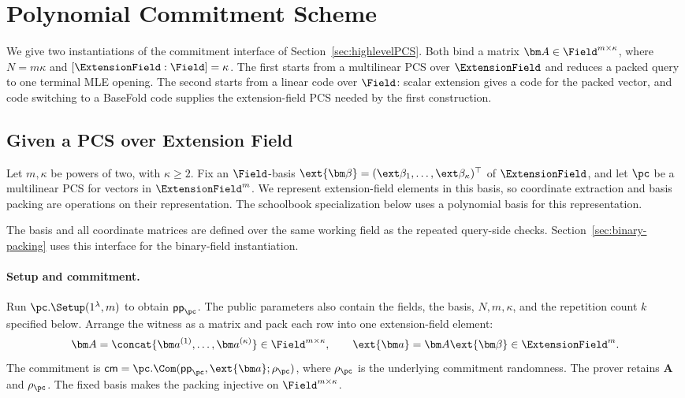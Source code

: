 \section{Polynomial Commitment Scheme}
\label{sec:pcs}

We give two instantiations of the commitment interface of
Section~\ref{sec:highlevelPCS}. Both bind a matrix
\(\bm A\in\Field^{m\times\kappa}\), where \(N=m\kappa\) and
\([\ExtensionField:\Field]=\kappa\).
The first starts from a multilinear PCS over \(\ExtensionField\)
and reduces a packed query to one terminal MLE opening.
The second starts from a linear code over \(\Field\): scalar
extension gives a code for the packed vector, and code switching
to a BaseFold code supplies the extension-field PCS needed by
the first construction.

\subsection{Given a PCS over Extension Field}
\label{sec:pcs-extension}

\medskip{}

Let \(m,\kappa\) be powers of two, with \(\kappa\geq2\).
Fix an \(\Field\)-basis
\(\ext{\bm\beta}=(\ext\beta_1,\ldots,\ext\beta_\kappa)^\top\)
of \(\ExtensionField\), and let \(\pc\) be a multilinear PCS for
vectors in \(\ExtensionField^m\).
We represent extension-field elements in this basis, so coordinate
extraction and basis packing are operations on their representation.
The schoolbook specialization below uses a polynomial basis for this
representation.

The basis and all coordinate matrices are defined over the same
working field as the repeated query-side checks.
Section~\ref{sec:binary-packing} uses this interface for the
binary-field instantiation.

\paragraph{Setup and commitment.}
Run \(\pc.\Setup(1^\lambda,m)\) to obtain
\(\mathsf{pp}_{\pc}\).
The public parameters also contain the fields, the basis, \(N,m,\kappa\),
and the repetition count \(k\) specified below.
Arrange the witness as a matrix and pack each row into one
extension-field element:
\[
    \bm A=\concat{\bm a^{(1)},\ldots,\bm a^{(\kappa)}}
        \in\Field^{m\times\kappa},
    \qquad
    \ext{\bm a}=\bm A\ext{\bm\beta}\in\ExtensionField^m.
\]
The commitment is
\(\mathsf{cm}=\pc.\Com(\mathsf{pp}_{\pc},\ext{\bm a};
\rho_{\pc})\), where \(\rho_{\pc}\) is the underlying commitment
randomness. The prover retains \(\bm A\) and \(\rho_{\pc}\).
The fixed basis makes the packing injective on
\(\Field^{m\times\kappa}\).

